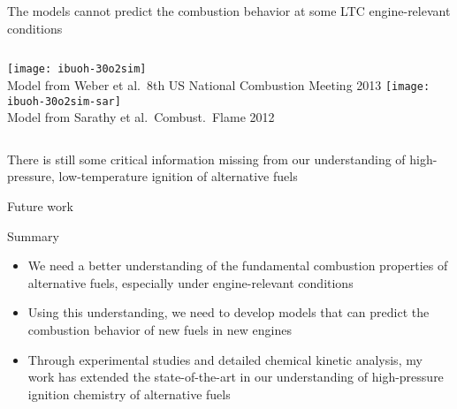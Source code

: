 \documentclass{beamer}
\begin{document}
\begin{frame}{The models cannot predict the combustion behavior at some LTC engine-relevant conditions}
    \begin{columns}
            \centering
            \texttt{[image: ibuoh-30o2sim]}\\
            Model from Weber et al.\ 8th US National Combustion Meeting 2013
            \centering
            \texttt{[image: ibuoh-30o2sim-sar]}\\
            Model from Sarathy et al.\ Combust.\ Flame 2012
    \end{columns}
    \vspace{0.5cm}
    \begin{center}
        There is still some critical information missing from our
        understanding of high-pressure, low-temperature ignition
        of alternative fuels
    \end{center}
\end{frame}

\begin{frame}{Future work}
\end{frame}

\begin{frame}{Summary}
    \begin{itemize}
        \item We need a better understanding of the fundamental
            combustion properties of alternative fuels, especially under
            engine-relevant conditions
        \item Using this understanding, we need to develop models that
            can predict the combustion behavior of new fuels in new engines
        \item Through experimental studies and detailed chemical kinetic
            analysis, my work has extended the state-of-the-art in our
            understanding of high-pressure ignition chemistry of alternative
            fuels
    \end{itemize}
\end{frame}
\end{document}
